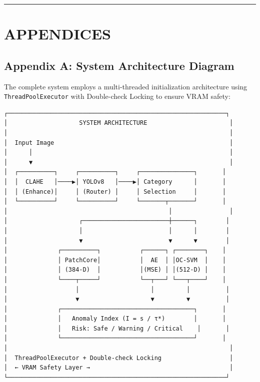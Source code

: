 \begin{center}\rule{0.5\linewidth}{0.5pt}\end{center}

\section{APPENDICES}\label{appendices}

\subsection{Appendix A: System Architecture Diagram}\label{appendix-a-system-architecture-diagram}

The complete system employs a multi-threaded initialization architecture using \texttt{ThreadPoolExecutor} with Double-check Locking to ensure VRAM safety:

\begin{verbatim}
┌─────────────────────────────────────────────────────────────┐
│                    SYSTEM ARCHITECTURE                       │
│                                                              │
│  Input Image                                                 │
│      │                                                       │
│      ▼                                                       │
│  ┌──────────┐     ┌──────────┐     ┌───────────────┐       │
│  │  CLAHE   │────▶│ YOLOv8   │────▶│ Category      │       │
│  │ (Enhance)│     │ (Router) │     │ Selection     │       │
│  └──────────┘     └──────────┘     └───────┬───────┘       │
│                                             │                │
│                    ┌────────────────────────┼──────┐        │
│                    │                        │      │        │
│                    ▼                        ▼      ▼        │
│              ┌──────────┐           ┌──────┐ ┌────────┐    │
│              │ PatchCore│           │  AE  │ │OC-SVM  │    │
│              │ (384-D)  │           │(MSE) │ │(512-D) │    │
│              └────┬─────┘           └──┬───┘ └───┬────┘    │
│                   │                    │         │          │
│                   ▼                    ▼         ▼          │
│              ┌─────────────────────────────────────┐       │
│              │   Anomaly Index (I = s / τ*)        │       │
│              │   Risk: Safe / Warning / Critical    │       │
│              └─────────────────────────────────────┘       │
│                                                              │
│  ThreadPoolExecutor + Double-check Locking                   │
│  ← VRAM Safety Layer →                                       │
└─────────────────────────────────────────────────────────────┘
\end{verbatim}

